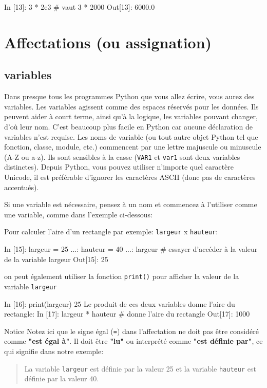 \documentclass[%
oneside,                 %
final,                   %
10pt]{article}
\begin{document}
\bipy
In [13]: 3 * 2e3   # vaut 3 * 2000
Out[13]: 6000.0
\eipy
\section{Affectations (ou assignation)}

\subsection{variables}
Dans presque tous les programmes Python que vous allez écrire, vous aurez des variables. Les variables agissent comme des espaces réservés pour les données. Ils peuvent aider à court terme, ainsi qu’à la logique, les variables pouvant changer, d’où leur nom. C’est beaucoup plus facile en Python car aucune déclaration de variables n’est requise. Les noms de variable (ou tout autre objet Python tel que fonction, classe, module, etc.) commencent par une lettre majuscule ou minuscule (A-Z ou a-z). Ils sont sensibles à la casse (\texttt{VAR1} et \texttt{var1} sont deux variables distinctes). Depuis Python, vous pouvez utiliser n’importe quel caractère Unicode, il est préférable d’ignorer les caractères ASCII (donc pas de caractères accentués).

Si une variable est nécessaire, pensez à un nom et commencez à l'utiliser comme une variable, comme dans l'exemple ci-dessous:

Pour calculer l'aire d'un rectangle par exemple: \texttt{largeur} x \texttt{hauteur}:

\bipy
In [15]: largeur = 25
    ...: hauteur = 40
    ...: largeur    # essayer d'accéder à la valeur de la variable largeur
Out[15]: 25
\eipy

on peut également utiliser la fonction \texttt{print()} pour afficher la valeur de la variable \texttt{largeur}

\bipy
In [16]: print(largeur)
25
\eipy
Le produit de ces deux variables donne l'aire du rectangle:
\bipy
In [17]: largeur * hauteur  # donne l'aire du rectangle
Out[17]: 1000
\eipy
\begin{block}{Notice}
Notez ici que le signe égal (\texttt{=}) dans l'affectation ne doit pas être considéré comme \textbf{"est égal à"}. Il doit être \textbf{"lu"} ou interprété comme \textbf{"est définie par"}, ce qui signifie dans notre exemple:

\begin{quote}
La variable \texttt{largeur} est définie par la valeur 25 et la variable \texttt{hauteur} est définie par la valeur 40.
\end{quote}

\end{block}
\end{document}
